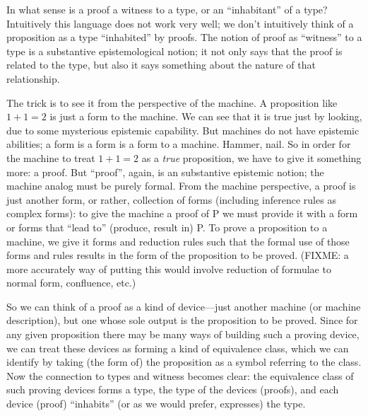 \begin{ednote}
  In what sense is a proof a witness to a type, or an ``inhabitant''
  of a type?  Intuitively this language does not work very well; we
  don't intuitively think of a proposition as a type ``inhabited'' by
  proofs.  The notion of proof as ``witness'' to a type is a
  substantive epistemological notion; it not only says that the proof
  is related to the type, but also it says something about the nature
  of that relationship.

  The trick is to see it from the perspective of the machine.  A
  proposition like \(1+1=2\) is just a form to the machine.  We can
  see that it is true just by looking, due to some mysterious
  epistemic capability.  But machines do not have epistemic abilities;
  a form is a form is a form to a machine.  Hammer, nail.  So in order
  for the machine to treat \(1+1=2\) as a \emph{true} proposition, we
  have to give it something more: a proof.  But ``proof'', again, is
  an substantive epistemic notion; the machine analog must be purely
  formal.  From the machine perspective, a proof is just another form,
  or rather, collection of forms (including inference rules as complex
  forms): to give the machine a proof of P we must provide it with a
  form or forms that ``lead to'' (produce, result in) P.  To prove a
  proposition to a machine, we give it forms and reduction rules such
  that the formal use of those forms and rules results in the form of
  the proposition to be proved.  (FIXME: a more accurately way of
  putting this would involve reduction of formulae to normal form,
  confluence, etc.)

  So we can think of a proof as a kind of device---just another
  machine (or machine description), but one whose sole output is the
  proposition to be proved.  Since for any given proposition there may
  be many ways of building such a proving device, we can treat these
  devices as forming a kind of equivalence class, which we can
  identify by taking (the form of) the proposition as a symbol
  referring to the class.  Now the connection to types and witness
  becomes clear: the equivalence class of such proving devices forms a
  type, the type of the devices (proofs), and each device (proof)
  ``inhabits'' (or as we would prefer, expresses) the type.
\end{ednote}
